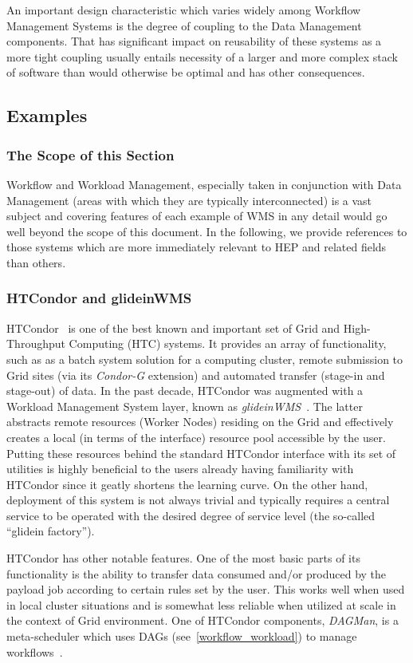 An important design characteristic which varies widely among Workflow Management Systems is the degree of coupling to the Data Management components. That has significant impact
on reusability of these systems as a more tight coupling usually entails necessity of a larger and more complex stack of software than would otherwise be optimal and has other consequences.

\subsection{Examples}
\label{wms_examples}
\subsubsection{The Scope of this Section}
Workflow and Workload Management, especially taken in conjunction with Data Management (areas with which they are typically interconnected) is a vast
subject and  covering features of each example of WMS in any detail would go well beyond the scope of this document. In the following, we provide references
to those systems which are more immediately relevant to HEP and related fields than others.

\subsubsection{HTCondor and glideinWMS}
\label{htcondor}
HTCondor~\cite{htcondor} is one of the best known and  important set of Grid and High-Throughput Computing (HTC) systems. It provides an array of functionality, such as
as a batch system solution for a computing cluster, remote submission to Grid sites (via its \textit{Condor-G} extension) and automated transfer (stage-in and stage-out) of data.
In the past decade, HTCondor was augmented with a  Workload Management System layer, known as \textit{glideinWMS}~\cite{glideinwms}. The latter abstracts remote
resources (Worker Nodes) residing on the Grid and effectively creates a local (in terms of the interface) resource pool accessible by the user.
Putting these resources behind the standard HTCondor interface with its set of utilities is highly beneficial to the users already having familiarity with HTCondor since it geatly shortens the learning curve.
On the other hand, deployment of this system is not always trivial and typically requires a central service to be operated with the desired degree of service level (the so-called ``glidein factory'').

HTCondor has other notable features. One of the most basic parts of its functionality is the ability to transfer data consumed and/or produced by the payload job according to certain rules set by the user. This works well
when used in local cluster situations and is somewhat less reliable when utilized at scale in the context of Grid environment. One of HTCondor components, \textit{DAGMan}, is a meta-scheduler
which uses DAGs (see~\ref{workflow_workload}) to manage workflows~\cite{dagman}.

